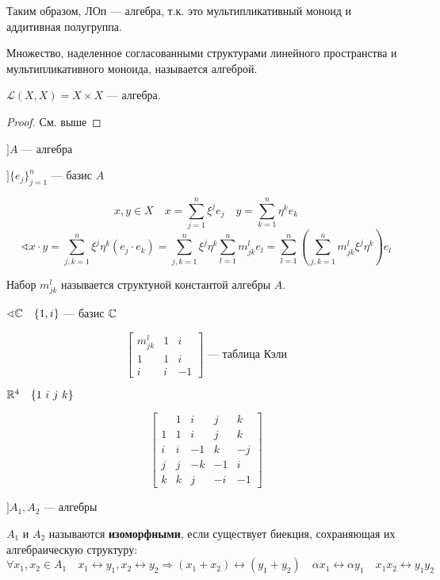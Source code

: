 Таким образом, ЛОп --- алгебра, т.к. это мультипликативный моноид и аддитивная полугруппа.

\begin{definition}
    Множество, наделенное согласованными структурами линейного пространства и мультипликативного моноида, называется алгеброй.
\end{definition}

\begin{theorem}
    $\mathcal{L}(X, X) = X\times X$ --- алгебра.
\end{theorem}
\begin{proof}
    См. выше
\end{proof}

$] A$ --- алгебра

$] \{e_j\}_{j=1}^n$ --- базис $A$

$$x,y\in X \quad x=\sum\limits_{j=1}^n \xi^je_j \quad y=\sum\limits_{k=1}^n \eta^ke_k$$
$$\sphericalangle x\cdot y = \sum\limits_{j,k=1}^n\xi^j\eta^k(e_j\cdot e_k) = \sum\limits_{j,k=1}^n \xi^j\eta^k\sum\limits_{l=1}^n m^l_{jk}e_l=\sum\limits_{l=1}^n\left(\sum\limits_{j,k=1}^n m^l_{jk}\xi^j\eta^k \right)e_l$$

\begin{definition}
    Набор $m^l_{jk}$ называется структуной константой алгебры $A$.
\end{definition}

\begin{example}
    $\sphericalangle \mathbb{C} \quad \{1, i\}$ --- базис $\mathbb{C}$

    $$\begin{bmatrix}
        m^l_{jk} & 1 & i \\
        1 & 1 & i \\
        i & i & -1
    \end{bmatrix} \text{ --- таблица Кэли}$$
\end{example}
\begin{example}
    $\mathbb{R}^4 \quad \{1\ i\ j\ k\}$

    $$\begin{bmatrix}
        & 1 & i & j & k \\
        1 & 1 & i & j & k \\
        i & i & -1 & k & -j \\
        j & j & -k & -1 & i \\
        k & k & j & -i & -1
    \end{bmatrix}$$
\end{example}

$] A_1, A_2$ --- алгебры

\begin{definition}
    $A_1$ и $A_2$ называются \textbf{изоморфными}, если существует биекция, сохраняющая их алгебраическую структуру:
    $$\forall x_1, x_2\in A_1 \quad x_1\leftrightarrow y_1, x_2\leftrightarrow y_2 \Rightarrow (x_1+x_2)\leftrightarrow (y_1+y_2) \quad \alpha x_1 \leftrightarrow \alpha y_1 \quad x_1x_2 \leftrightarrow y_1y_2$$
\end{definition}

